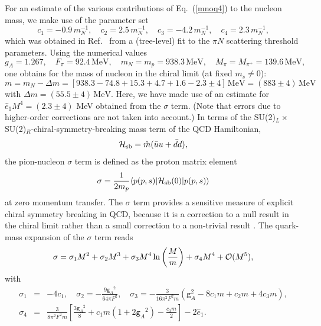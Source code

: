 \documentclass[twoside,12pt]{article}
\begin{document}
   For an estimate of the various contributions of Eq.\ (\ref{mnoq4}) to the nucleon mass,
we make use of the parameter set
\begin{equation}
\label{parametersci}
c_1=-0.9\,m_N^{-1},\quad
c_2=2.5\, m_N^{-1},\quad
c_3=-4.2\, m_N^{-1},\quad
c_4=2.3\, m_N^{-1},
\end{equation}
which was obtained in Ref.\ \cite{Becher:2001hv} from a (tree-level) fit to
the $\pi N$ scattering threshold parameters.
   Using the numerical values
\begin{equation}
\label{numericalvalues}
g_A=1.267,\quad F_\pi=92.4\,\mbox{MeV},\quad
m_N=m_p=938.3\,\mbox{MeV},\quad M_\pi=M_{\pi^+}=139.6\,\mbox{MeV},
\end{equation}
one obtains for the mass of nucleon in the chiral limit (at
fixed $m_s\neq 0$):
\begin{equation}
m=m_N-\Delta m
=[938.3-74.8+15.3+4.7+1.6-2.3\pm 4]\,\mbox{MeV}
=(883\pm 4)\, \mbox{MeV}
\end{equation}
with $\Delta m=(55.5\pm 4)\,\mbox{MeV}$.
   Here, we have made use of an estimate for $\hat{e}_1M^4=(2.3\pm 4)$ MeV obtained from
the $\sigma$ term.
   (Note that errors due to higher-order corrections are not taken into account.)
   In terms of the SU(2)$_L\times$SU(2)$_R$-chiral-symmetry-breaking mass term of the
QCD Hamiltonian,
\begin{equation}
{\cal H_{\rm sb}}=\hat{m}(\bar u u+\bar d d),
\end{equation}
the pion-nucleon $\sigma$ term is defined as the proton matrix element
\begin{equation}
\sigma=\frac{1}{2m_p}\langle p(p,s)|{\cal H_{\rm sb}}(0)|p(p,s)\rangle
\end{equation}
at zero momentum transfer.
   The $\sigma$ term provides a sensitive measure of explicit chiral symmetry
breaking in QCD, because it is a correction to a null result in the chiral limit rather
than a small correction to a non-trivial result \cite{Pagels:1974se}.
   The quark-mass expansion of the $\sigma$ term reads
\begin{equation}
\sigma=\sigma_1 M^2+\sigma_2 M^3 +\sigma_3 M^4 \ln\left(\frac{M}{m}\right)
+\sigma_4 M^4+{\cal O}(M^5),
\end{equation}
with
\begin{eqnarray}
\label{parsigmai}
\sigma_1&=&-4 c_1,\quad
\sigma_2=-\frac{9{\texttt{g}_{A}}^2}{64\pi F^2},\quad
\sigma_3=-\frac{3}{16\pi^2 F^2 m}\left(\texttt{g}_A^2-8c_1m+c_2m+4 c_3m\right),
\nonumber\\
\sigma_4&=&\frac{3}{8\pi^2 F^2m}\left[\frac{3 {\texttt{g}_{A}}^2}{8}
+c_1m(1+2 {\texttt{g}_A}^2)-\frac{c_3m}{2}\right]-2\hat{e}_1.
\end{eqnarray}
\end{document}
